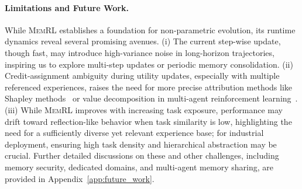 \documentclass{article}
\theoremstyle{plain}
\theoremstyle{definition}
\theoremstyle{remark}
\begin{document}
\paragraph{Limitations and Future Work.}
While \textsc{MemRL} establishes a foundation for non-parametric evolution, its runtime dynamics reveal several promising avenues. (i) The current step-wise update, though fast, may introduce high-variance noise in long-horizon trajectories, inspiring us to explore multi-step updates or periodic memory consolidation. (ii) Credit-assignment ambiguity during utility updates, especially with multiple referenced experiences, raises the need for more precise attribution methods like Shapley methods~\citep{shapley1953value} or value decomposition in multi-agent reinforcement learning~\citep{rashid2020monotonic,sunehag2017value}. (iii) While \textsc{MemRL} improves with increasing task exposure, performance may drift toward reflection-like behavior when task similarity is low, highlighting the need for a sufficiently diverse yet relevant experience base; for industrial deployment, ensuring high task density and hierarchical abstraction may be crucial. Further detailed discussions on these and other challenges, including memory security, dedicated domains, and multi-agent memory sharing, are provided in Appendix~\ref{app:future_work}.
\end{document}
